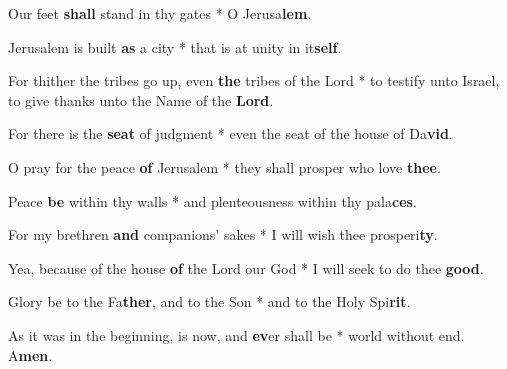 \begin{multicols}{2}
	Our feet \textbf{shall} stand in thy gates * O Jerusa\textbf{lem}.
	
	Jerusalem is built \textbf{as} a city * that is at unity in it\textbf{self}.
	
	For thither the tribes go up, even \textbf{the} tribes of the Lord * to testify unto Israel, to give thanks unto the Name of the \textbf{Lord}.
	
	For there is the \textbf{seat} of judgment * even the seat of the house of Da\textbf{vid}.
	
	O pray for the peace \textbf{of} Jerusalem * they shall prosper who love \textbf{thee}.
	
	Peace \textbf{be} within thy walls * and plenteousness within thy pala\textbf{ces}.
	
	For my brethren \textbf{and} companions' sakes * I will wish thee prosperi\textbf{ty}.
	
	Yea, because of the house \textbf{of} the Lord our God * I will seek to do thee \textbf{good}.
	
	Glory be to the Fa\textbf{ther}, and to the Son * and to the Holy Spi\textbf{rit}.
	
	As it was in the beginning, is now, and \textbf{ev}er shall be * world without end. A\textbf{men}.
\end{multicols}